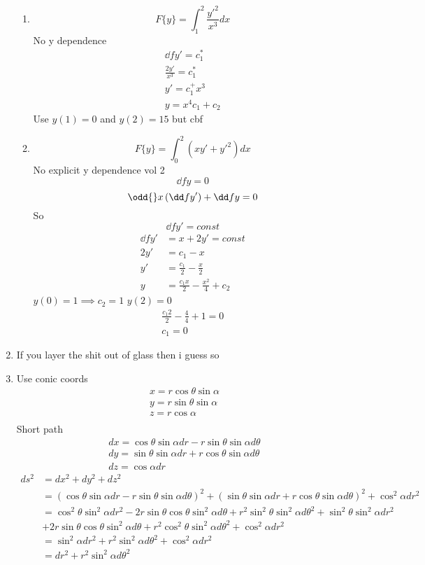 \documentclass{E:/Documents/Latex/myassignment}
\begin{document}
\begin{enumerate}
\begin{enumerate}
		\item
		\[F\{y\} = \int_1^2 \frac{y'^2}{x^3} dx\] 
		No y dependence
		\begin{align*}
			\dd f{y'} = c_1^*\\
			\frac{2y'}{x^3} =c_1^*\\
			y' = c_1^+ x^3\\
			y = x^4 c_1 + c_2
		\end{align*}
		Use $y(1) = 0$ and $y(2) = 15$ but cbf
		\item
		\[F\{y\} = \int_0^2 (xy' + y'^2) dx \]
		No explicit y dependence vol 2
		\[\dd fy = 0\]
		\[\odd{}x \left(\dd f{y'}\right) + \dd fy = 0\]
		So
		\[\dd f{y'} =const \]
		\begin{align*}
			\dd f{y'} &= x + 2y' = const\\
			2y'&=c_1 -x\\
			y' &= \frac{c_1}2 -\frac{x}{2}\\
			y &= \frac{c_1 x}{2} - \frac{x^2}{4} + c_2
		\end{align*}
		$y(0) = 1 \implies c_2 =1$
		$y(2) = 0$
		\begin{align*}
			\frac{c_1 2}{2} - \frac{4}{4} +1 = 0\\
			c_1 = 0
		\end{align*}
	\end{enumerate}
	\item If you layer the shit out of glass then i guess so
	\item 
	Use conic coords
	\begin{align*}
		x = r\cos \theta \sin \alpha\\
		y = r\sin \theta \sin \alpha\\
		z = r\cos \alpha\\
	\end{align*}
	Short path
	\begin{align*}
	 	dx = \cos\theta \sin \alpha dr - r\sin\theta \sin \alpha d\theta\\
	 	dy = \sin\theta \sin \alpha dr + r\cos\theta \sin \alpha d\theta\\
	 	dz = \cos\alpha dr
	\end{align*} 
	\begin{align*}
		ds^2 &= dx^2 + dy^2 + dz^2\\
		&= \left(\cos\theta \sin \alpha dr - r\sin\theta \sin \alpha d\theta\right)^2 + \left(\sin\theta \sin \alpha dr + r\cos\theta \sin \alpha d\theta\right)^2 + \cos^2\alpha dr^2\\
		&= \cos^2 \theta \sin^2 \alpha dr^2 - 2r\sin\theta\cos\theta \sin^2 \alpha d\theta + r^2 \sin^2\theta \sin^2 \alpha d\theta^2 + \sin^2\theta \sin^2\alpha dr^2 \\&+ 2r \sin\theta\cos\theta\sin^2 \alpha d\theta + r^2\cos^2\theta \sin^2 \alpha d\theta^2 + \cos^2 \alpha dr^2\\
		&= \sin^2\alpha dr^2 + r^2 \sin^2\alpha d\theta^2 + \cos^2 \alpha dr^2\\
		&= dr^2 + r^2 \sin^2\alpha d\theta^2
	\end{align*}


\end{enumerate}
\end{document}
